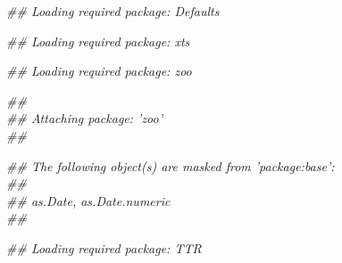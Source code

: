\documentclass[review, authoryear]{elsarticle}\usepackage{graphicx, color}
\makeatletter
\newenvironment{kframe}{%
 \def\at@end@of@kframe{}%
 \ifinner\ifhmode%
  \def\at@end@of@kframe{\end{minipage}}%
  \begin{minipage}{\columnwidth}%
 \fi\fi%
 \def\FrameCommand##1{\hskip\@totalleftmargin \hskip-\fboxsep
 \colorbox{shadecolor}{##1}\hskip-\fboxsep
     \hskip-\linewidth \hskip-\@totalleftmargin \hskip\columnwidth}%
 \MakeFramed {\advance\hsize-\width
   \@totalleftmargin\z@ \linewidth\hsize
   \@setminipage}}%
 {\par\unskip\endMakeFramed%
 \at@end@of@kframe}
\newenvironment{knitrout}{}{} %
\makeatother
\begin{document}
\begin{knitrout}
\color{fgcolor}\begin{kframe}


{\ttfamily\noindent\itshape\textcolor{messagecolor}{\#\# Loading required package: Defaults}}

{\ttfamily\noindent\itshape\textcolor{messagecolor}{\#\# Loading required package: xts}}

{\ttfamily\noindent\itshape\textcolor{messagecolor}{\#\# Loading required package: zoo}}

{\ttfamily\noindent\itshape\textcolor{messagecolor}{\#\# \\\#\# Attaching package: 'zoo'\\\#\# }}

{\ttfamily\noindent\itshape\textcolor{messagecolor}{\#\# The following object(s) are masked from 'package:base':\\\#\# \\\#\#     as.Date, as.Date.numeric\\\#\# }}

{\ttfamily\noindent\itshape\textcolor{messagecolor}{\#\# Loading required package: TTR}}\end{kframe}
\end{knitrout}
\end{document}
